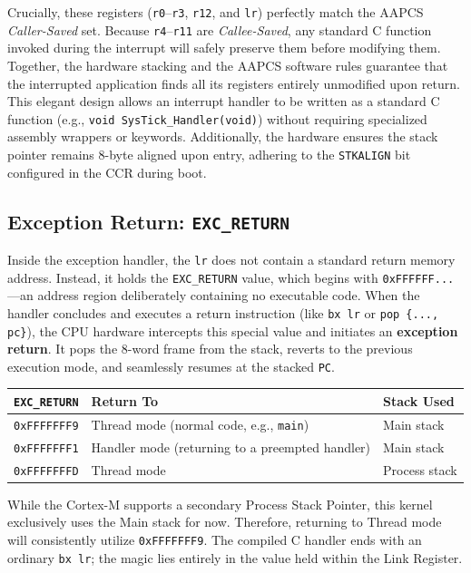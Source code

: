 Crucially, these registers (\texttt{r0}--\texttt{r3}, \texttt{r12}, and \texttt{lr}) perfectly match the AAPCS \textit{Caller-Saved} set. Because \texttt{r4}--\texttt{r11} are \textit{Callee-Saved}, any standard C function invoked during the interrupt will safely preserve them before modifying them. Together, the hardware stacking and the AAPCS software rules guarantee that the interrupted application finds all its registers entirely unmodified upon return. This elegant design allows an interrupt handler to be written as a standard C function (e.g., \texttt{void SysTick\_Handler(void)}) without requiring specialized assembly wrappers or keywords. Additionally, the hardware ensures the stack pointer remains 8-byte aligned upon entry, adhering to the \texttt{STKALIGN} bit configured in the CCR during boot.

\subsection{Exception Return: \texttt{EXC\_RETURN}}
Inside the exception handler, the \texttt{lr} does not contain a standard return memory address. Instead, it holds the \texttt{EXC\_RETURN} value, which begins with \texttt{0xFFFFFF...}---an address region deliberately containing no executable code. When the handler concludes and executes a return instruction (like \texttt{bx lr} or \texttt{pop \{..., pc\}}), the CPU hardware intercepts this special value and initiates an \textbf{exception return}. It pops the 8-word frame from the stack, reverts to the previous execution mode, and seamlessly resumes at the stacked \texttt{PC}.

\begin{table}[h!]
    \centering
    \begin{tabular}{lll}
        \toprule
        \textbf{\texttt{EXC\_RETURN}} & \textbf{Return To} & \textbf{Stack Used} \\
        \midrule
        \texttt{0xFFFFFFF9} & Thread mode (normal code, e.g., \texttt{main}) & Main stack \\
        \texttt{0xFFFFFFF1} & Handler mode (returning to a preempted handler) & Main stack \\
        \texttt{0xFFFFFFFD} & Thread mode & Process stack \\
        \bottomrule
    \end{tabular}
\end{table}

While the Cortex-M supports a secondary Process Stack Pointer, this kernel exclusively uses the Main stack for now. Therefore, returning to Thread mode will consistently utilize \texttt{0xFFFFFFF9}. The compiled C handler ends with an ordinary \texttt{bx lr}; the magic lies entirely in the value held within the Link Register.

